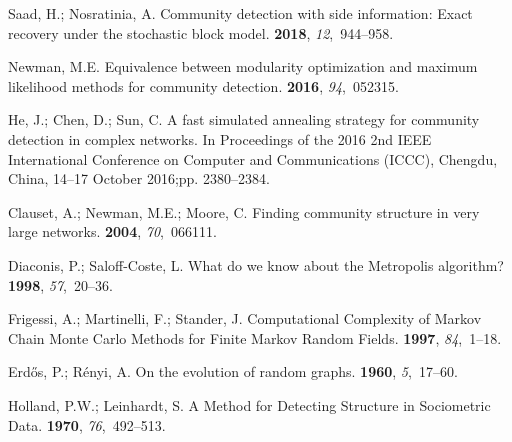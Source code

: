 \documentclass[entropy,article,accept,moreauthors,pdftex]{Definitions/mdpi}
\newcommand{\1}{\mathbbm{1}}
\begin{document}
\begin{thebibliography}{999}
Saad, H.; Nosratinia, A.
\newblock Community detection with side information: Exact recovery under the
  stochastic block model.
 {\bf
  2018}, {\em 12},~944--958.

Newman, M.E.
\newblock Equivalence between modularity optimization and maximum likelihood methods for community detection.
 {\bf 2016}, {\em 94},~052315.

He, J.; Chen, D.; Sun, C.
\newblock A fast simulated annealing strategy for community detection in complex networks. In Proceedings of the 2016 2nd IEEE International Conference on Computer and Communications (ICCC), {Chengdu, China, 14--17 October} 2016;\linebreak pp. 2380--2384.

Clauset, A.; Newman, M.E.; Moore, C.
\newblock Finding community structure in very large networks.
 {\bf 2004}, {\em 70},~066111.

Diaconis, P.; Saloff-Coste, L.
\newblock What do we know about the Metropolis algorithm?
 {\bf 1998}, {\em
  57},~20--36.

Frigessi, A.; Martinelli, F.; Stander, J.
\newblock Computational Complexity of Markov Chain Monte Carlo Methods for Finite Markov Random Fields.
 {\bf 1997}, {\em 84},~1--18.

Erd{\H{o}}s, P.; R{\'e}nyi, A.
\newblock On the evolution of random graphs.
 {\bf 1960}, {\em 5},~17--60.

Holland, P.W.; Leinhardt, S.
\newblock A Method for Detecting Structure in Sociometric Data.
 {\bf 1970}, {\em 76},~492--513.

\end{thebibliography}


\end{document}
